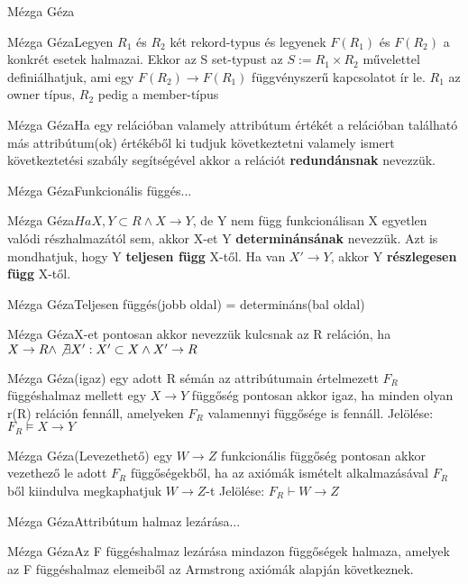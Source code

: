 \begin{definicio}{Mézga Géza}
\end{definicio}\begin{definicio}{Mézga Géza}Legyen $R_1$ és $R_2$ két rekord-typus és legyenek $F(R_1)$ és $F(R_2)$ a konkrét esetek halmazai. Ekkor az S set-typust az $S:= R_1 \times R_2$ művelettel definiálhatjuk, ami egy $F(R_2)\rightarrow F(R_1)$ függvényszerű kapcsolatot ír le. $R_1$ az owner típus, $R_2$ pedig a member-típus
\end{definicio}\begin{definicio}{Mézga Géza}Ha egy relációban valamely attribútum értékét a relációban található más attribútum(ok) értékéből ki tudjuk következtetni valamely ismert következtetési szabály segítségével akkor a relációt \textbf{redundánsnak} nevezzük.
\end{definicio}\begin{definicio}{Mézga Géza}Funkcionális függés...
\end{definicio}\begin{definicio}{Mézga Géza}$Ha X,Y \subset R \land X\rightarrow Y$, de Y nem függ funkcionálisan X egyetlen valódi részhalmazától sem, akkor X-et Y \textbf{determinánsának} nevezzük. Azt is mondhatjuk, hogy Y \textbf{teljesen függ} X-től. Ha van $X'\rightarrow Y$, akkor Y \textbf{részlegesen függ} X-től.
\end{definicio}\begin{definicio}{Mézga Géza}Teljesen függés(jobb oldal) = determináns(bal oldal)
\end{definicio}\begin{definicio}{Mézga Géza}X-et pontosan akkor nevezzük kulcsnak az R reláción, ha $X \rightarrow R \land \not\exists X' : X' \subset X \land X' \rightarrow R$
\end{definicio}\begin{definicio}{Mézga Géza}(igaz) egy adott R sémán az attribútumain értelmezett $F_R$ függéshalmaz mellett egy $X \rightarrow Y$ függőség pontosan akkor igaz, ha minden olyan r(R) reláción fennáll, amelyeken $F_R$ valamennyi függősége is fennáll. Jelölése: $F_R\models X \rightarrow Y$
\end{definicio}\begin{definicio}{Mézga Géza}(Levezethető) egy $W \rightarrow Z$ funkcionális függőség pontosan akkor vezethező le adott $F_R$ függőségekből, ha az axiómák ismételt alkalmazásával $F_R$ ből kiindulva megkaphatjuk $W \rightarrow Z$-t Jelölése: $F_R\vdash W\rightarrow Z$
\end{definicio}\begin{definicio}{Mézga Géza}Attribútum halmaz lezárása...
\end{definicio}\begin{definicio}{Mézga Géza}Az F függéshalmaz lezárása mindazon függőségek halmaza, amelyek az F függéshalmaz elemeiből az Armstrong axiómák alapján következnek.


\end{definicio}
